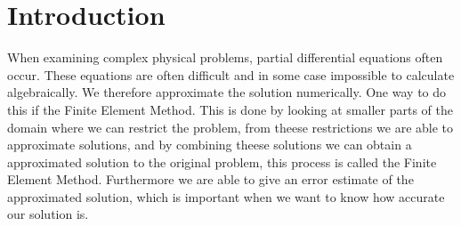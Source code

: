 \chapter{Introduction}
When examining complex physical problems, partial differential equations often occur. 
These equations are often difficult and in some case impossible to calculate algebraically.
We therefore approximate the solution numerically.
One way to do this if the Finite Element Method.
This is done by looking at smaller parts of the domain where we can restrict the problem,
from theese restrictions we are able to approximate solutions, 
and by combining theese solutions we can obtain a approximated solution to the original problem, 
this process is called the Finite Element Method.
Furthermore we are able to give an error estimate of the approximated solution, 
which is important when we want to know how accurate our solution is.